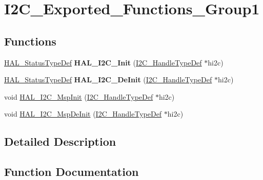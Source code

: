 \hypertarget{group___i2_c___exported___functions___group1}{}\section{I2\+C\+\_\+\+Exported\+\_\+\+Functions\+\_\+\+Group1}
\label{group___i2_c___exported___functions___group1}
\subsection*{Functions}
\begin{DoxyCompactItemize}
\item 
\mbox{\label{group___i2_c___exported___functions___group1_ga9d29159a6da072287fff73743fd93260}} 
\mbox{\hyperlink{stm32f4xx__hal__def_8h_a63c0679d1cb8b8c684fbb0632743478f}{H\+A\+L\+\_\+\+Status\+Type\+Def}} {\bfseries H\+A\+L\+\_\+\+I2\+C\+\_\+\+Init} (\mbox{\hyperlink{struct_i2_c___handle_type_def}{I2\+C\+\_\+\+Handle\+Type\+Def}} $\ast$hi2c)
\item 
\mbox{\label{group___i2_c___exported___functions___group1_gabda634ba18f874775d1262c887d273b4}} 
\mbox{\hyperlink{stm32f4xx__hal__def_8h_a63c0679d1cb8b8c684fbb0632743478f}{H\+A\+L\+\_\+\+Status\+Type\+Def}} {\bfseries H\+A\+L\+\_\+\+I2\+C\+\_\+\+De\+Init} (\mbox{\hyperlink{struct_i2_c___handle_type_def}{I2\+C\+\_\+\+Handle\+Type\+Def}} $\ast$hi2c)
\item 
void \mbox{\hyperlink{group___i2_c___exported___functions___group1_gabe01a202c27b23fc150aa66af3130073}{H\+A\+L\+\_\+\+I2\+C\+\_\+\+Msp\+Init}} (\mbox{\hyperlink{struct_i2_c___handle_type_def}{I2\+C\+\_\+\+Handle\+Type\+Def}} $\ast$hi2c)
\item 
void \mbox{\hyperlink{group___i2_c___exported___functions___group1_ga2ec8d9b09854c732e2feed549278f048}{H\+A\+L\+\_\+\+I2\+C\+\_\+\+Msp\+De\+Init}} (\mbox{\hyperlink{struct_i2_c___handle_type_def}{I2\+C\+\_\+\+Handle\+Type\+Def}} $\ast$hi2c)
\end{DoxyCompactItemize}


\subsection{Detailed Description}


\subsection{Function Documentation}
\mbox{\label{group___i2_c___exported___functions___group1_ga2ec8d9b09854c732e2feed549278f048}} 
